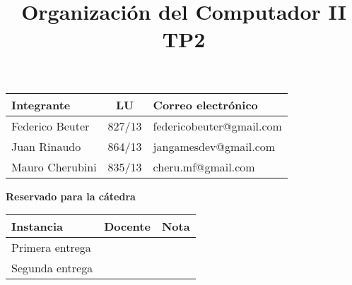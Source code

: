 \documentclass[10pt,a4paper]{article}
\author{}
\title{Organización del Computador II \\ TP2}
\begin{document}

\maketitle

\bigskip

\begin{table}[h]
\centering
\begin{tabular}{|l l l|}
\hline
Integrante       & \multicolumn{1}{c}{LU}     & Correo electrónico        \\ \hline
Federico Beuter & 827/13                      & federicobeuter@gmail.com \\
Juan Rinaudo & 864/13                      & jangamesdev@gmail.com \\ 
Mauro Cherubini & 835/13                      & cheru.mf@gmail.com \\ \hline
\end{tabular}
\end{table}

\vfill

\begin{center}
\textbf{Reservado para la cátedra}
\end{center}
\begin{table}[h]
\centering
\begin{tabular}{|l|l|l|}
\hline
Instancia       & Docente & Nota \\ \hline
Primera entrega &         &      \\ \hline
Segunda entrega &         &      \\ \hline
\end{tabular}
\end{table}

\pagebreak

\tableofcontents


\pagebreak


\newpage


\newpage


\newpage


\newpage


\newpage


\newpage


\newpage


\newpage
\end{document}
